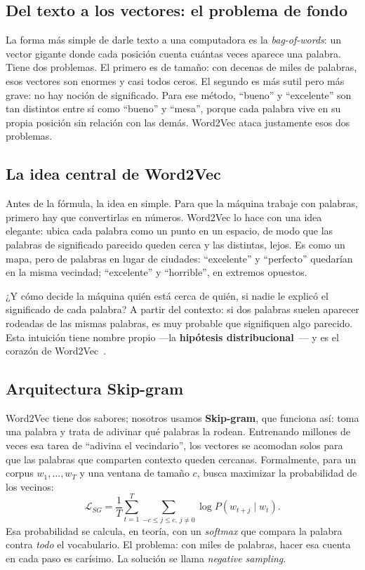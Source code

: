 \documentclass[11pt]{article}
\begin{document}
\subsection{Del texto a los vectores: el problema de fondo}
La forma más simple de darle texto a una computadora es la \emph{bag-of-words}: un vector
gigante donde cada posición cuenta cuántas veces aparece una palabra. Tiene dos problemas. El
primero es de tamaño: con decenas de miles de palabras, esos vectores son enormes y casi
todos ceros. El segundo es más sutil pero más grave: no hay noción de significado. Para ese
método, ``bueno'' y ``excelente'' son tan distintos entre sí como ``bueno'' y ``mesa'', porque
cada palabra vive en su propia posición sin relación con las demás. Word2Vec ataca justamente
esos dos problemas.

\subsection{La idea central de Word2Vec}
Antes de la fórmula, la idea en simple. Para que la máquina trabaje con palabras, primero hay
que convertirlas en números. Word2Vec lo hace con una idea elegante: ubica cada palabra como
un punto en un espacio, de modo que las palabras de significado parecido queden cerca y las
distintas, lejos. Es como un mapa, pero de palabras en lugar de ciudades: ``excelente'' y
``perfecto'' quedarían en la misma vecindad; ``excelente'' y ``horrible'', en extremos
opuestos.

¿Y cómo decide la máquina quién está cerca de quién, si nadie le explicó el significado de
cada palabra? A partir del contexto: si dos palabras suelen aparecer rodeadas de las mismas
palabras, es muy probable que signifiquen algo parecido. Esta intuición tiene nombre propio
---la \textbf{hipótesis distribucional}~\cite{harris1954}--- y es el corazón de Word2Vec~\cite{mikolov2013a}.

\subsection{Arquitectura Skip-gram}
Word2Vec tiene dos sabores; nosotros usamos \textbf{Skip-gram}, que funciona así: toma una
palabra y trata de adivinar qué palabras la rodean. Entrenando millones de veces esa tarea
de ``adivina el vecindario'', los vectores se acomodan solos para que las palabras que
comparten contexto queden cercanas. Formalmente, para un corpus $w_1,\dots,w_T$ y una ventana
de tamaño $c$, busca maximizar la probabilidad de los vecinos:
\begin{equation}
\mathcal{L}_{SG} = \frac{1}{T}\sum_{t=1}^{T}\sum_{-c\le j\le c,\, j\ne 0}
\log P(w_{t+j}\mid w_t).
\end{equation}
Esa probabilidad se calcula, en teoría, con un \emph{softmax} que compara la palabra contra
\emph{todo} el vocabulario. El problema: con miles de palabras, hacer esa cuenta en cada paso
es carísimo. La solución se llama \emph{negative sampling}.
\end{document}
